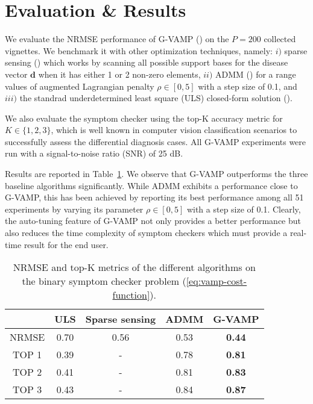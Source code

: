 \documentclass[pmlr,twocolumn,10pt]{jmlr} %
\begin{document}
\section{Evaluation \& Results}
\vspace{-0.15cm}
We evaluate the NRMSE performance of G-VAMP (\cite{rangan2019vector}) on the $P = 200$ collected vignettes. We benchmark it with other optimization techniques, namely: $i)$ sparse sensing (\cite{rozenberg2018sparse}) which works by scanning all possible support bases for the disease vector $\bm{d}$ when it has either 1 or 2 non-zero elements, $ii)$ ADMM (\cite{boyd2011distributed}) for a range values of augmented Lagrangian penalty $\rho \in [0,5]$ with a step size of 0.1, and $iii)$ the standrad underdetermined least square (ULS) closed-form solution (\cite{datta2010numerical}).
\iffalse
\begin{equation*}
\small
    \textrm{NRMSE} ~=~\frac{1}{P}\sum_{\ell=1}^{P} \frac{\|\mathbf{A}_{\ell}\,\mathbf{d}_{\ell}^*-\bm{A}_{\ell}\,\widehat{\mathbf{d}}_{\ell}\|_{\textrm{F}}}{\|\mathbf{A}_{\ell}\,\mathbf{d}_{\ell}^*\|_{\textrm{F}}}
\end{equation*}
\fi
We also evaluate the symptom checker using the top-K accuracy metric for $K \in \{1,2,3\}$, which is well known in computer vision classification scenarios to successfully assess the differential diagnosis cases. All G-VAMP experiments were run with a signal-to-noise ratio (SNR) of 25 dB.

Results are reported in Table~\ref{tab:NRMSE-topk}. We observe that G-VAMP outperforms the three baseline algorithms significantly. While ADMM exhibits a performance close to G-VAMP, this has been achieved by reporting its best performance among all 51 experiments by varying its parameter $\rho \in [0,5]$  with a step size of 0.1. Clearly, the auto-tuning feature of G-VAMP not only provides a better performance but also reduces the time complexity of symptom checkers which must provide a real-time result for the end user.\vspace{-0.1cm}

\begin{table}[ht]
\scriptsize
\centering
\caption{NRMSE and top-K metrics of the different algorithms on the binary symptom checker problem (\ref{eq:vamp-cost-function}).}
\vspace{-0.2cm}
\begin{tabular}[t]{ccccc}
\cmidrule[0.028cm]{2-5}
&\textbf{ULS}&\textbf{Sparse sensing}&\textbf{ADMM}&\textbf{G-VAMP}\\
\midrule
NRMSE&0.70&0.56&0.53&\textbf{0.44}\\ \midrule
TOP 1&0.39&-&0.78&\textbf{0.81}\\ \midrule
TOP 2&0.41&-&0.81&\textbf{0.83}\\ \midrule
TOP 3&0.43&-&0.84&\textbf{0.87}\\
\bottomrule
\end{tabular}
\label{tab:NRMSE-topk}
\end{table}
\end{document}
